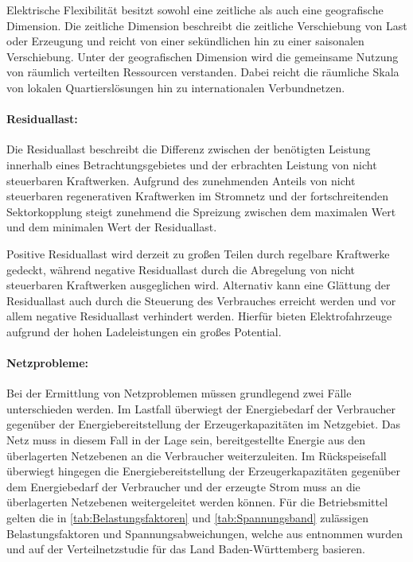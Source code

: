Elektrische Flexibilität besitzt sowohl eine zeitliche als auch eine geografische Dimension.
Die zeitliche Dimension beschreibt die zeitliche Verschiebung von Last oder Erzeugung und reicht von einer sekündlichen hin zu einer saisonalen Verschiebung.
Unter der geografischen Dimension wird die gemeinsame Nutzung von räumlich verteilten Ressourcen verstanden.
Dabei reicht die räumliche Skala von lokalen Quartierslösungen hin zu internationalen Verbundnetzen. \cite{BNetzA2017} \cite{IEA2014}


\paragraph{Residuallast:}

Die Residuallast beschreibt die Differenz zwischen der benötigten Leistung innerhalb eines Betrachtungsgebietes und der erbrachten Leistung von nicht steuerbaren Kraftwerken.
Aufgrund des zunehmenden Anteils von nicht steuerbaren regenerativen Kraftwerken im Stromnetz und der fortschreitenden Sektorkopplung steigt zunehmend die Spreizung zwischen dem maximalen Wert und dem minimalen Wert der Residuallast.\medskip


Positive Residuallast wird derzeit zu großen Teilen durch regelbare Kraftwerke gedeckt, während negative Residuallast durch die Abregelung von nicht steuerbaren Kraftwerken ausgeglichen wird.
Alternativ kann eine Glättung der Residuallast auch durch die Steuerung des Verbrauches erreicht werden und vor allem negative Residuallast verhindert werden.
Hierfür bieten Elektrofahrzeuge aufgrund der hohen Ladeleistungen ein großes Potential. \cite{Paschotta2020a}


\paragraph{Netzprobleme:}

Bei der Ermittlung von Netzproblemen müssen grundlegend zwei Fälle unterschieden werden.
Im Lastfall überwiegt der Energiebedarf der Verbraucher gegenüber der Energiebereitstellung der Erzeugerkapazitäten im Netzgebiet.
Das Netz muss in diesem Fall in der Lage sein, bereitgestellte Energie aus den überlagerten Netzebenen an die Verbraucher weiterzuleiten.
Im Rückspeisefall überwiegt hingegen die Energiebereitstellung der Erzeugerkapazitäten gegenüber dem Energiebedarf der Verbraucher und der erzeugte Strom muss an die überlagerten Netzebenen weitergeleitet werden können. \cite{Agora2019}
Für die Betriebsmittel gelten die in \autoref{tab:Belastungsfaktoren} und \autoref{tab:Spannungsband} zulässigen Belastungsfaktoren und Spannungsabweichungen, welche aus \cite{Mueller2019a} entnommen wurden und auf der Verteilnetzstudie für das Land Baden-Württemberg \cite{Rehtanz2017} basieren.


